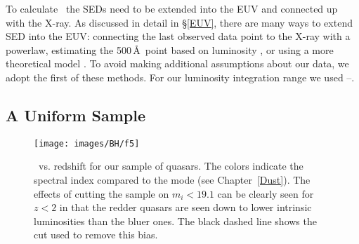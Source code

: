 To calculate \lbol\, the SEDs need to be extended into the EUV and connected up with the X-ray.  As discussed in detail in \S\ref{EUV}, there are many ways to extend SED into the EUV: connecting the last observed data point to the X-ray with a powerlaw, estimating the 500\,\AA\ point based on luminosity \citep{Scott:2004}, or using a more theoretical model \citep{Casebeer:2006}.  To avoid making additional assumptions about our data, we adopt the first of these methods.  For our luminosity integration range we used \onemum--\twokev.
 
\subsection{A Uniform Sample}

\begin{figure}[tp]
\begin{center}
	\texttt{[image: images/BH/f5]}
\caption[Luminosity vs. redshift]{\label{l_z_alpha} \ltwofive\ vs. redshift for our sample of quasars.  The colors indicate the spectral index compared to the mode (see Chapter~\ref{Dust}).  The effects of cutting the sample on $m_i<19.1$ can be clearly seen for $z<2$ in that the redder quasars are seen down to lower intrinsic luminosities than the bluer ones. The black dashed line shows the cut used to remove this bias.}
\end{center}
\end{figure}

